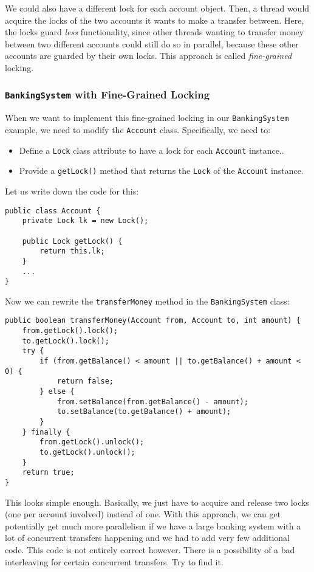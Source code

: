 \documentclass[main.tex]{subfiles}
\begin{document}
We could also have a different lock for each account object. Then, a thread would acquire the locks of the two accounts it wants to make a transfer between. Here, the locks guard \textit{less} functionality, since other threads wanting to transfer money between two different accounts could still do so in parallel, because these other accounts are guarded by their own locks. This approach is called \textit{fine-grained} locking.

\subsubsection{\texttt{BankingSystem} with Fine-Grained Locking}
When we want to implement this fine-grained locking in our \texttt{BankingSystem} example, we need to modify the \texttt{Account} class. Specifically, we need to:

\begin{itemize}
  \item Define a \texttt{Lock} class attribute to have a lock for each \texttt{Account} instance..
  \item Provide a \texttt{getLock()} method that returns the \texttt{Lock} of the \texttt{Account} instance.
\end{itemize}

\noindent Let us write down the code for this:

\begin{verbatim}
public class Account {
    private Lock lk = new Lock();

    public Lock getLock() {
        return this.lk;
    }
    ...
}
\end{verbatim}

\noindent Now we can rewrite the \texttt{transferMoney} method in the \texttt{BankingSystem} class:

\begin{verbatim}
public boolean transferMoney(Account from, Account to, int amount) {
    from.getLock().lock();
    to.getLock().lock();
    try {
        if (from.getBalance() < amount || to.getBalance() + amount < 0) {
            return false;
        } else {
            from.setBalance(from.getBalance() - amount);
            to.setBalance(to.getBalance() + amount);
        }
    } finally {
        from.getLock().unlock();
        to.getLock().unlock();
    }
    return true;
}
\end{verbatim}

\noindent This looks simple enough. Basically, we just have to acquire and release two locks (one per account involved) instead of one. With this approach, we can get potentially get much more parallelism if we have a large banking system with a lot of concurrent transfers happening and we had to add very few additional code. This code is not entirely correct however. There is a possibility of a bad interleaving for certain concurrent transfers. Try to find it.
\end{document}
